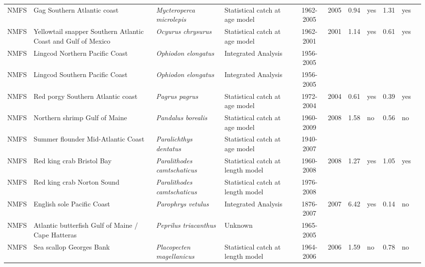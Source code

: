 \begin{longtable}{p{1.8cm}p{3.5cm}p{3.5cm}p{3cm}cccp{0.9cm}cp{0.9cm}c}
  NMFS & Gag Southern Atlantic coast & \textit{Mycteroperca microlepis} & Statistical catch at age model & 1962-2005 & 2005 & 0.94 & yes & 1.31 & yes & \cite{JENSEN_GAGSATLC_2006.pdf} \\ 
  NMFS & Yellowtail snapper Southern Atlantic Coast and Gulf of Mexico & \textit{Ocyurus chrysurus} & Statistical catch at age model & 1962-2001 & 2001 & 1.14 & yes & 0.61 & yes & \cite{2003_SEDAR_Yellowtailsnapper.pdf} \\ 
  NMFS & Lingcod Northern Pacific Coast & \textit{Ophiodon elongatus} & Integrated Analysis & 1956-2005 &  &  &  &  &  & \cite{2005-SAFE-WClingcod.pdf} \\ 
  NMFS & Lingcod Southern Pacific Coast & \textit{Ophiodon elongatus} & Integrated Analysis & 1956-2005 &  &  &  &  &  & \cite{2005_SAFE_Wclingcod.pdf} \\ 
  NMFS & Red porgy Southern Atlantic coast & \textit{Pagrus pagrus} & Statistical catch at age model & 1972-2004 & 2004 & 0.61 & yes & 0.39 & yes & \cite{JENSEN_RPORGYSATLC_2006.pdf} \\ 
  NMFS & Northern shrimp Gulf of Maine & \textit{Pandalus borealis} & Statistical catch at age model & 1960-2009 & 2008 & 1.58 & no & 0.56 & no & \cite{2008ShrimpAssessment.pdf} \\ 
  NMFS & Summer flounder Mid-Atlantic Coast & \textit{Paralichthys dentatus} & Statistical catch at age model & 1940-2007 &  &  &  &  &  & \cite{NMFS-MATLC-Paralichthysdentatus-2008.pdf} \\ 
  NMFS & Red king crab Bristol Bay & \textit{Paralithodes camtschaticus} & Statistical catch at length model & 1960-2008 & 2008 & 1.27 & yes & 1.05 & yes & \cite{CRABSAFE2008.pdf} \\ 
  NMFS & Red king crab Norton Sound & \textit{Paralithodes camtschaticus} & Statistical catch at length model & 1976-2008 &  &  &  &  &  & \cite{CRABSAFE2008.pdf} \\ 
  NMFS & English sole Pacific Coast & \textit{Parophrys vetulus} & Integrated Analysis & 1876-2007 & 2007 & 6.42 & yes & 0.14 & no & \cite{NWFSC-ESOLEPCOAST-2007-EnglishSole.pdf} \\ 
  NMFS & Atlantic butterfish Gulf of Maine / Cape Hatteras & \textit{Peprilus triacanthus} & Unknown & 1965-2005 &  &  &  &  &  & \cite{butterfish-assessment-2004.pdf} \\ 
  NMFS & Sea scallop Georges Bank & \textit{Placopecten magellanicus} & Statistical catch at length model & 1964-2006 & 2006 & 1.59 & no & 0.78 & no & \cite{SeaScallop2007.pdf} \\ 

\end{longtable}
